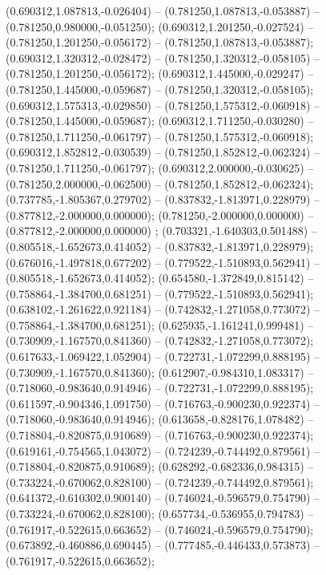  (0.690312,1.087813,-0.026404) -- (0.781250,1.087813,-0.053887) -- (0.781250,0.980000,-0.051250);
 (0.690312,1.201250,-0.027524) -- (0.781250,1.201250,-0.056172) -- (0.781250,1.087813,-0.053887);
 (0.690312,1.320312,-0.028472) -- (0.781250,1.320312,-0.058105) -- (0.781250,1.201250,-0.056172);
 (0.690312,1.445000,-0.029247) -- (0.781250,1.445000,-0.059687) -- (0.781250,1.320312,-0.058105);
 (0.690312,1.575313,-0.029850) -- (0.781250,1.575312,-0.060918) -- (0.781250,1.445000,-0.059687);
 (0.690312,1.711250,-0.030280) -- (0.781250,1.711250,-0.061797) -- (0.781250,1.575312,-0.060918);
 (0.690312,1.852812,-0.030539) -- (0.781250,1.852812,-0.062324) -- (0.781250,1.711250,-0.061797);
 (0.690312,2.000000,-0.030625) -- (0.781250,2.000000,-0.062500) -- (0.781250,1.852812,-0.062324);
 (0.737785,-1.805367,0.279702) -- (0.837832,-1.813971,0.228979) -- (0.877812,-2.000000,0.000000);
 (0.781250,-2.000000,0.000000) -- (0.877812,-2.000000,0.000000) ;
 (0.703321,-1.640303,0.501488) -- (0.805518,-1.652673,0.414052) -- (0.837832,-1.813971,0.228979);
 (0.676016,-1.497818,0.677202) -- (0.779522,-1.510893,0.562941) -- (0.805518,-1.652673,0.414052);
 (0.654580,-1.372849,0.815142) -- (0.758864,-1.384700,0.681251) -- (0.779522,-1.510893,0.562941);
 (0.638102,-1.261622,0.921184) -- (0.742832,-1.271058,0.773072) -- (0.758864,-1.384700,0.681251);
 (0.625935,-1.161241,0.999481) -- (0.730909,-1.167570,0.841360) -- (0.742832,-1.271058,0.773072);
 (0.617633,-1.069422,1.052904) -- (0.722731,-1.072299,0.888195) -- (0.730909,-1.167570,0.841360);
 (0.612907,-0.984310,1.083317) -- (0.718060,-0.983640,0.914946) -- (0.722731,-1.072299,0.888195);
 (0.611597,-0.904346,1.091750) -- (0.716763,-0.900230,0.922374) -- (0.718060,-0.983640,0.914946);
 (0.613658,-0.828176,1.078482) -- (0.718804,-0.820875,0.910689) -- (0.716763,-0.900230,0.922374);
 (0.619161,-0.754565,1.043072) -- (0.724239,-0.744492,0.879561) -- (0.718804,-0.820875,0.910689);
 (0.628292,-0.682336,0.984315) -- (0.733224,-0.670062,0.828100) -- (0.724239,-0.744492,0.879561);
 (0.641372,-0.610302,0.900140) -- (0.746024,-0.596579,0.754790) -- (0.733224,-0.670062,0.828100);
 (0.657734,-0.536955,0.794783) -- (0.761917,-0.522615,0.663652) -- (0.746024,-0.596579,0.754790);
 (0.673892,-0.460886,0.690445) -- (0.777485,-0.446433,0.573873) -- (0.761917,-0.522615,0.663652);
